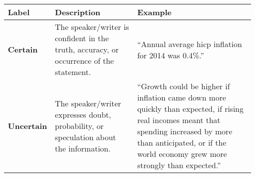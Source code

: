 \begin{table*}
    \caption{}
    \vspace{1em}
    \begin{tabular}{p{}p{}p{}}
    \toprule
    \textbf{Label} & \textbf{Description} & \textbf{Example}\\
    \midrule
    \textbf{Certain} & The speaker/writer is confident in the truth, accuracy, or occurrence of the statement. & ``Annual average hicp inflation for 2014 was 0.4\%.'' \\
    \midrule
    \textbf{Uncertain} & The speaker/writer expresses doubt, probability, or speculation about the information. & ``Growth could be higher if inflation came down more quickly than expected, if rising real incomes meant that spending increased by more than anticipated, or if the world economy grew more strongly than expected.'' \\
    \bottomrule
    \end{tabular}
    \label{tb:ecb_certainty_guide}
    \end{table*}
    